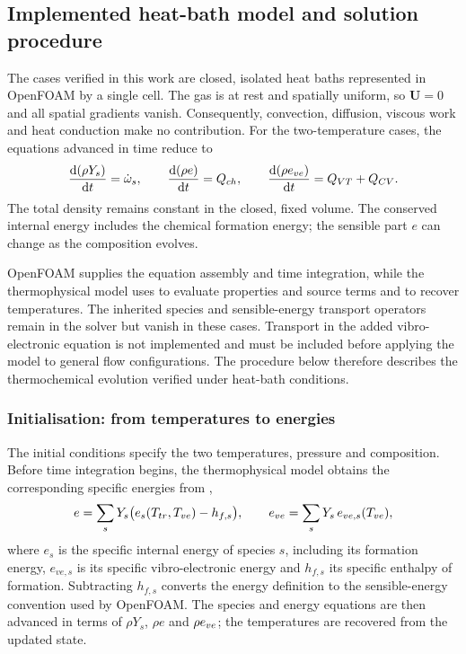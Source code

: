 \subsection{Implemented heat-bath model and solution procedure}
\label{sec:implementato}

The cases verified in this work are closed, isolated heat baths represented
in OpenFOAM by a single cell. The gas is at rest and spatially uniform, so
$\mathbf{U}=0$ and all spatial gradients vanish. Consequently, convection,
diffusion, viscous work and heat conduction make no contribution. For the
two-temperature cases, the equations advanced in time reduce to
\begin{equation}
  \frac{\mathrm{d}(\rho Y_s)}{\mathrm{d}t} = \dot\omega_s ,
  \qquad
  \frac{\mathrm{d}(\rho e)}{\mathrm{d}t} = Q_{ch} ,
  \qquad
  \frac{\mathrm{d}(\rho e_{ve})}{\mathrm{d}t} = Q_{VT}+Q_{CV} .
\end{equation}
The total density remains constant in the closed, fixed volume. The
conserved internal energy includes the chemical formation energy; the
sensible part $e$ can change as the composition evolves.

OpenFOAM supplies the equation assembly and time integration, while the
thermophysical model uses \mpp{} to evaluate properties and source terms and
to recover temperatures. The inherited species and sensible-energy transport
operators remain in the solver but vanish in these cases. Transport in the
added vibro-electronic equation is not implemented and must be included
before applying the model to general flow configurations. The procedure
below therefore describes the thermochemical evolution verified under
heat-bath conditions.

\subsubsection{Initialisation: from temperatures to energies}
\label{sec:implementato-avvio}

The initial conditions specify the two temperatures, pressure and composition.
Before time integration begins, the thermophysical model obtains the
corresponding specific energies from \mpp{},
\begin{equation}
  e = \sum_s Y_s\big(e_s(T_{tr},T_{ve}) - h_{f,s}\big),
  \qquad
  e_{ve} = \sum_s Y_s\,e_{ve,s}(T_{ve}) ,
\end{equation}
where $e_s$ is the specific internal energy of species $s$, including its
formation energy, $e_{ve,s}$ is its specific vibro-electronic energy and
$h_{f,s}$ its specific enthalpy of formation. Subtracting $h_{f,s}$ converts the \mpp{}
energy definition to the sensible-energy convention used by OpenFOAM. The
species and energy equations are then advanced in terms of $\rho Y_s$,
$\rho e$ and $\rho e_{ve}$; the temperatures are recovered from the updated
state.

